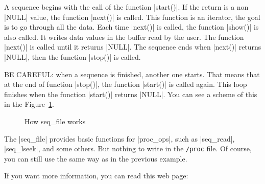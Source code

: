 \documentclass[10pt, oneside]{book}
\begin{document}
A sequence begins with the call of the function \cpp|start()|.
If the return is a non \cpp|NULL| value, the function \cpp|next()| is called.
This function is an iterator, the goal is to go through all the data.
Each time \cpp|next()| is called, the function \cpp|show()| is also called.
It writes data values in the buffer read by the user.
The function \cpp|next()| is called until it returns \cpp|NULL|.
The sequence ends when \cpp|next()| returns \cpp|NULL|, then the function \cpp|stop()| is called.

BE CAREFUL: when a sequence is finished, another one starts.
That means that at the end of function \cpp|stop()|, the function \cpp|start()| is called again.
This loop finishes when the function \cpp|start()| returns \cpp|NULL|.
You can see a scheme of this in the Figure~\ref{img:seqfile}.

\begin{figure}[h]
  \center
  \caption{How seq\_file works}
  \label{img:seqfile}
\end{figure}

The \cpp|seq_file| provides basic functions for \cpp|proc_ops|, such as \cpp|seq_read|, \cpp|seq_lseek|, and some others.
But nothing to write in the \verb|/proc| file.
Of course, you can still use the same way as in the previous example.


If you want more information, you can read this web page:
\end{document}
